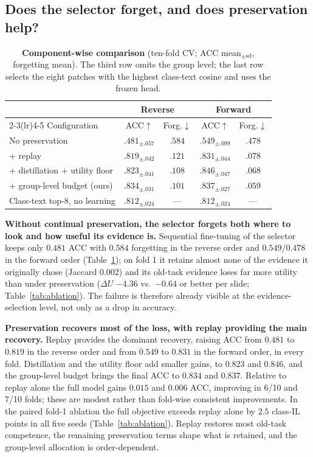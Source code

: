 \documentclass{article}
\begin{document}
\subsection{Does the selector forget, and does preservation help?}
\label{ssec:ablation}

\begin{table}[!htb]
\centering\footnotesize\renewcommand{\arraystretch}{0.92}
\setlength{\tabcolsep}{3.5pt}
\caption{\textbf{Component-wise comparison} (ten-fold CV; ACC mean$_{\pm\text{sd}}$, forgetting mean). The third row omits the group level; the last row selects the eight patches with the highest class-text cosine and uses the frozen head.}
\label{tab:chain}
\begin{tabular}{lcccc}
\toprule
& \multicolumn{2}{c}{Reverse} & \multicolumn{2}{c}{Forward} \\
\cmidrule(lr){2-3}\cmidrule(lr){4-5}
Configuration & ACC$\uparrow$ & Forg.$\downarrow$ & ACC$\uparrow$ & Forg.$\downarrow$ \\
\midrule
No preservation & $.481_{\pm.057}$ & $.584$ & $.549_{\pm.099}$ & $.478$ \\
+ replay & $.819_{\pm.042}$ & $.121$ & $.831_{\pm.044}$ & $.078$ \\
+ distillation + utility floor & $.823_{\pm.041}$ & $.108$ & $.846_{\pm.047}$ & $.068$ \\
+ group-level budget (ours) & $.834_{\pm.031}$ & $.101$ & $.837_{\pm.027}$ & $.059$ \\
Class-text top-8, no learning & $.812_{\pm.024}$ & --- & $.812_{\pm.024}$ & --- \\
\bottomrule
\end{tabular}
\end{table}

\textbf{Without continual preservation, the selector forgets both where to look and how useful its evidence is.} Sequential fine-tuning of the selector keeps only $0.481$ ACC with $0.584$ forgetting in the reverse order and $0.549$/$0.478$ in the forward order (Table~\ref{tab:chain}); on fold 1 it retains almost none of the evidence it originally chose (Jaccard $0.002$) and its old-task evidence loses far more utility than under preservation ($\Delta U$ $-4.36$ vs.\ $-0.64$ or better per slide; Table~\ref{tab:ablation}). The failure is therefore already visible at the evidence-selection level, not only as a drop in accuracy.

\textbf{Preservation recovers most of the loss, with replay providing the main recovery.} Replay provides the dominant recovery, raising ACC from $0.481$ to $0.819$ in the reverse order and from $0.549$ to $0.831$ in the forward order, in every fold. Distillation and the utility floor add smaller gains, to $0.823$ and $0.846$, and the group-level budget brings the final ACC to $0.834$ and $0.837$. Relative to replay alone the full model gains $0.015$ and $0.006$ ACC, improving in 6/10 and 7/10 folds; these are modest rather than fold-wise consistent improvements. In the paired fold-1 ablation the full objective exceeds replay alone by $2.5$ class-IL points in all five seeds (Table~\ref{tab:ablation}). Replay restores most old-task competence, the remaining preservation terms shape what is retained, and the group-level allocation is order-dependent.
\end{document}
